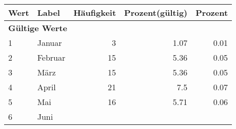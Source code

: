      \begin{longtable}{lXrrr}
     \toprule
     \textbf{Wert} & \textbf{Label} & \textbf{Häufigkeit} & \textbf{Prozent(gültig)} & \textbf{Prozent} \\
     \endhead
     \midrule
     \multicolumn{5}{l}{\textbf{Gültige Werte}}\\

     1 &
     \multicolumn{1}{X}{ Januar   } &


       \num{3} &
       \num[round-mode=places,round-precision=2]{1.07} &
         \num[round-mode=places,round-precision=2]{0.01} \\

     2 &
     \multicolumn{1}{X}{ Februar   } &


       \num{15} &
       \num[round-mode=places,round-precision=2]{5.36} &
         \num[round-mode=places,round-precision=2]{0.05} \\

     3 &
     \multicolumn{1}{X}{ März   } &


       \num{15} &
       \num[round-mode=places,round-precision=2]{5.36} &
         \num[round-mode=places,round-precision=2]{0.05} \\

     4 &
     \multicolumn{1}{X}{ April   } &


       \num{21} &
       \num[round-mode=places,round-precision=2]{7.5} &
         \num[round-mode=places,round-precision=2]{0.07} \\

     5 &
     \multicolumn{1}{X}{ Mai   } &


       \num{16} &
       \num[round-mode=places,round-precision=2]{5.71} &
         \num[round-mode=places,round-precision=2]{0.06} \\

     6 &
     \multicolumn{1}{X}{ Juni   } &



\end{longtable}
